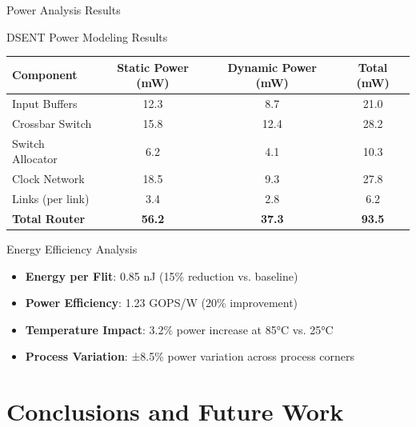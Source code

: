 \documentclass[10pt,aspectratio=169]{beamer}
\begin{document}
\begin{frame}{Power Analysis Results}
    \begin{block}{DSENT Power Modeling Results}
        \begin{center}
        \scriptsize
        \begin{tabular}{|l|c|c|c|}
            \hline
            \textbf{Component} & \textbf{Static Power (mW)} & \textbf{Dynamic Power (mW)} & \textbf{Total (mW)} \\
            \hline
            Input Buffers & 12.3 & 8.7 & 21.0 \\
            Crossbar Switch & 15.8 & 12.4 & 28.2 \\
            Switch Allocator & 6.2 & 4.1 & 10.3 \\
            Clock Network & 18.5 & 9.3 & 27.8 \\
            Links (per link) & 3.4 & 2.8 & 6.2 \\
            \textbf{Total Router} & \textbf{56.2} & \textbf{37.3} & \textbf{93.5} \\
            \hline
        \end{tabular}
        \end{center}
    \end{block}
    
    \begin{block}{Energy Efficiency Analysis}
        \begin{itemize}
            \item \textbf{Energy per Flit}: 0.85 nJ (15\% reduction vs. baseline)
            \item \textbf{Power Efficiency}: 1.23 GOPS/W (20\% improvement)
            \item \textbf{Temperature Impact}: 3.2\% power increase at 85°C vs. 25°C
            \item \textbf{Process Variation}: ±8.5\% power variation across process corners
        \end{itemize}
    \end{block}
\end{frame}

\section{Conclusions and Future Work}
\end{document}
